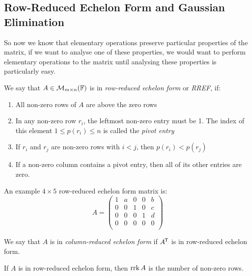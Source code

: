 \documentclass[../main.tex]{subfiles}
\begin{document}
\subsection{Row-Reduced Echelon Form and Gaussian Elimination}
So now we know that elementary operations preserve particular properties of the matrix, if we want to analyse one of these properties, we would want to perform elementary operations to the matrix until analysing these properties is particularly easy.
\begin{definition}
  We say that $A \in \mathcal{M}_{m \times n}(\mathbb{F})$ is in \textit{row-reduced echelon form} or \textit{RREF}, if: \label{RREF}
  \begin{enumerate}
    \item All non-zero rows of $A$ are above the zero rows
    \item In any non-zero row $r_i$, the leftmost non-zero entry must be 1.
      The index of this element $1 \leq p(r_i) \leq n$ is called the \textit{pivot entry}
    \item If $r_i$ and $r_j$ are non-zero rows with $i < j$, then $p(r_i) < p(r_j)$
    \item If a non-zero column contains a pivot entry, then all of its other entries are zero.
  \end{enumerate}
\end{definition}
\begin{example}
  An example $4 \times 5$ row-reduced echelon form matrix is:
  \[
    A = \begin{pmatrix}
    1 & a & 0 & 0 & b \\
    0 & 0 & 1 & 0 & c \\
    0 & 0 & 0 & 1 & d \\
    0 & 0 & 0 & 0 & 0 \\
    \end{pmatrix}
  \]
\end{example}
\begin{definition}
  We say that $A$ is in \textit{column-reduced echelon form} if $A^{{\mkern-1.5mu\mathsf{T}}}$ is in row-reduced echelon form.
\end{definition}
\begin{lemma}
  If $A$ is in row-reduced echelon form, then $\operatorname{rrk} A$ is the number of non-zero rows. \label{RREFRank}
\end{lemma}
\end{document}
